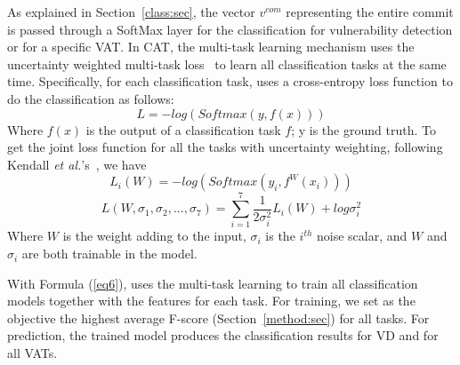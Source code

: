 As explained in Section~\ref{class:sec}, the vector $v^{com}$
representing the entire commit is passed through a SoftMax layer for
the classification for vulnerability detection or for a specific VAT.
In CAT, the multi-task learning mechanism uses the uncertainty
weighted multi-task loss~\cite{kendall2018multi} to learn all 
classification tasks at the same time. Specifically, for each
classification task, \tool uses a cross-entropy loss function to do
the classification as follows:
\begin{equation}\label{eq4}
	L = -log(Softmax(y, f(x)))
\end{equation}
Where $f(x)$ is the output of a classification task $f$; y is the
ground truth. To get the joint loss function for all the tasks with
uncertainty weighting, following Kendall {\em et
  al.}'s~\cite{kendall2018multi}, we have
\begin{equation}\label{eq5}
	L_i(W) = -log(Softmax(y_i, f^W(x_i)))
\end{equation}
\begin{equation}\label{eq6}
	L(W, \sigma_1, \sigma_2, ..., \sigma_7) = \sum_{i=1}^7\frac{1}{2\sigma_i^2}L_i(W) + log \sigma^2_i
\end{equation}
Where $W$ is the weight adding to the input, $\sigma_i$ is the
$i^{th}$ noise scalar, and $W$ and $\sigma_i$ are both trainable in
the model.

With Formula (\ref{eq6}), {\tool} uses the multi-task
learning to train all classification models together with the
features for each task. For training, we set as the objective the
highest average F-score (Section~\ref{method:sec}) for all
tasks. For prediction, the trained model produces the
classification results for VD and for all VATs.



